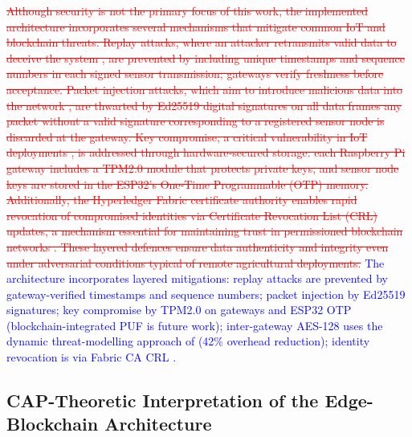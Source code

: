 \documentclass[pdflatex,sn-mathphys-num]{sn-jnl}
\theoremstyle{thmstyleone}
\theoremstyle{thmstyletwo}
\theoremstyle{thmstylethree}
\begin{document}
{\textcolor{red}{\sout{Although security is not the primary focus of this work, the implemented architecture incorporates several mechanisms that mitigate common IoT and blockchain threats. Replay attacks, where an attacker retransmits valid data to deceive the system , are prevented by including unique timestamps and sequence numbers in each signed sensor transmission; gateways verify freshness before acceptance. Packet injection attacks, which aim to introduce malicious data into the network , are thwarted by Ed25519 digital signatures on all data frames any packet without a valid signature corresponding to a registered sensor node is discarded at the gateway. Key compromise, a critical vulnerability in IoT deployments , is addressed through hardware‑secured storage: each Raspberry Pi gateway includes a TPM2.0 module that protects private keys, and sensor node keys are stored in the ESP32's One‑Time Programmable (OTP) memory. Additionally, the Hyperledger Fabric certificate authority enables rapid revocation of compromised identities via Certificate Revocation List (CRL) updates, a mechanism essential for maintaining trust in permissioned blockchain networks . These layered defences ensure data authenticity and integrity even under adversarial conditions typical of remote agricultural deployments.}}
\textcolor{blue}{The architecture incorporates layered mitigations: replay attacks \cite{yavari2020blockchain} are prevented by gateway-verified timestamps and sequence numbers; packet injection \cite{kalaimathi2025injection} by Ed25519 signatures; key compromise \cite{kumari2025rom} by TPM2.0 on gateways and ESP32 OTP (blockchain-integrated PUF \cite{pufblockchain2025} is future work); inter-gateway AES-128 uses the dynamic threat-modelling approach of \cite{aesembedded2025} (42\% overhead reduction); identity revocation is via Fabric CA CRL \cite{lu2022revocation, hyperledger2022msp}.}

\subsection{CAP-Theoretic Interpretation of the Edge-Blockchain Architecture}
\label{subsec:cap_theorem}

}
\end{document}
